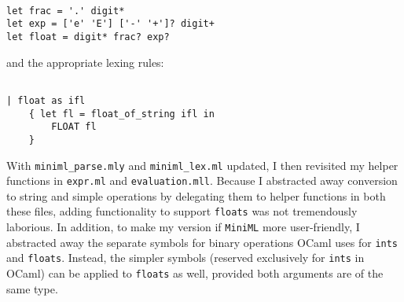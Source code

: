 \documentclass{report}
\begin{document}
\begin{verbatim}

let frac = '.' digit*
let exp = ['e' 'E'] ['-' '+']? digit+
let float = digit* frac? exp?

\end{verbatim}

\newline \newline
and the appropriate lexing rules:
\begin{verbatim}

| float as ifl
    { let fl = float_of_string ifl in
        FLOAT fl
    }

\end{verbatim}
\newline \newline
With \texttt{miniml_parse.mly} and \texttt{miniml_lex.ml} updated, I then revisited my helper functions in \texttt{expr.ml} and \texttt{evaluation.mll}. Because I abstracted away conversion to string and simple operations by delegating them to helper functions in both these files, adding functionality to support \texttt{floats} was not tremendously laborious. In addition, to make my version if \texttt{MiniML} more user-friendly, I abstracted away the separate symbols for binary operations OCaml uses for \texttt{ints} and \texttt{floats}. Instead, the simpler symbols (reserved exclusively for \texttt{ints} in OCaml) can be applied to \texttt{floats} as well, provided both arguments are of the same type.
\end{document}
